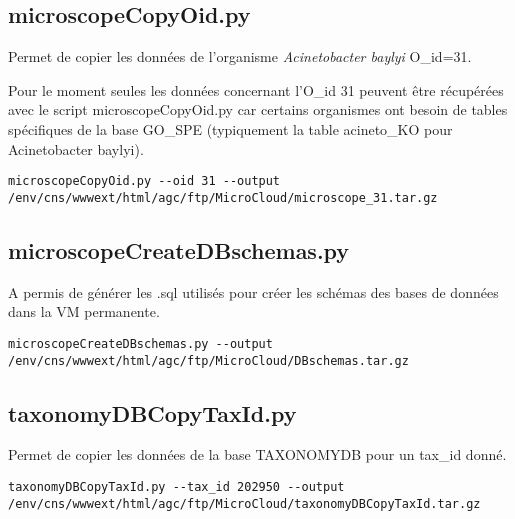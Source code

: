 \subsection{microscopeCopyOid.py}
Permet de copier les données de l'organisme \textit{Acinetobacter baylyi} O\_id=31. 

\begin{mycolorbox}
	Pour le moment seules les données concernant l'O\_id 31 peuvent être récupérées avec le script microscopeCopyOid.py car certains organismes ont besoin de tables spécifiques de la base GO\_SPE (typiquement la table acineto\_KO pour Acinetobacter baylyi).
\end{mycolorbox}

\begin{lstlisting}[style=bash]
microscopeCopyOid.py --oid 31 --output /env/cns/wwwext/html/agc/ftp/MicroCloud/microscope_31.tar.gz
\end{lstlisting}

\subsection{microscopeCreateDBschemas.py}
A permis de générer les .sql utilisés pour créer les schémas des bases de données dans la VM permanente.

\begin{lstlisting}[style=bash]
microscopeCreateDBschemas.py --output /env/cns/wwwext/html/agc/ftp/MicroCloud/DBschemas.tar.gz
\end{lstlisting}

\subsection{taxonomyDBCopyTaxId.py}
Permet de copier les données de la base TAXONOMYDB pour un tax\_id donné.

\begin{lstlisting}[style=bash]
taxonomyDBCopyTaxId.py --tax_id 202950 --output /env/cns/wwwext/html/agc/ftp/MicroCloud/taxonomyDBCopyTaxId.tar.gz
\end{lstlisting}